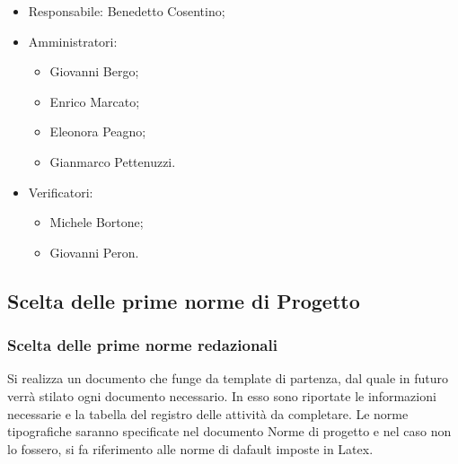 \documentclass[11pt,a4paper]{article}
\begin{document}
	\begin{itemize}
	\item Responsabile: Benedetto Cosentino;
	\item Amministratori:
		\begin{itemize}
		\item Giovanni Bergo;
		\item Enrico Marcato;
		\item Eleonora Peagno;
		\item Gianmarco Pettenuzzi.
		\end{itemize}
	\item Verificatori:
		\begin{itemize}
			\item Michele Bortone;
			\item Giovanni Peron.
		\end{itemize}
	\end{itemize}
	\subsection{Scelta delle prime norme di Progetto}	
	\subsubsection{Scelta delle prime norme redazionali}
	Si realizza un documento che funge da template di partenza, dal quale in futuro verrà stilato ogni documento necessario. In esso sono riportate le informazioni necessarie e la tabella del registro delle attività da completare. Le norme tipografiche saranno specificate nel documento Norme di progetto e nel caso non lo fossero, si fa riferimento alle norme di dafault imposte in Latex.
\end{document}
